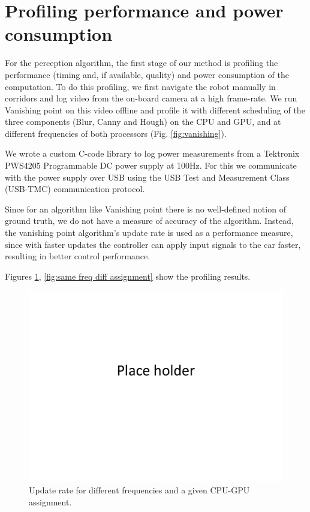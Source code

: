 \section{Profiling performance and power consumption}

For the perception algorithm, the first stage of our method is profiling the performance (timing and, if available, quality) and power consumption of the computation. 
To do this profiling, we first navigate the robot manually in corridors and log video from the on-board camera at a high frame-rate. 
We run Vanishing point on this video offline and profile it with different scheduling of the three components (Blur, Canny and Hough) on the CPU and GPU, and at different frequencies of both processors (Fig. \ref{fig:vanishing}).

We wrote a custom C-code library to log power measurements from a Tektronix PWS4205 Programmable DC power supply at 100Hz. 
For this we communicate with the power supply over USB using the USB Test and Measurement Class (USB-TMC) communication protocol. 

Since for an algorithm like Vanishing point there is no well-defined notion of ground truth, we do not have a measure of accuracy of the algorithm. 
Instead, the vanishing point algorithm's update rate is used as a performance measure, since with faster updates the controller can apply input signals to the car faster, resulting in better control performance. 

Figures \ref{fig:diff freq same assignment}, \ref{fig:same freq diff assignment} show the profiling results.
\begin{figure}[t]
\centering
\includegraphics[scale=0.2]{Figs/placeHolder}
\caption{Update rate for different frequencies and a given CPU-GPU assignment.}
\label{fig:diff freq same assignment}
\end{figure}

